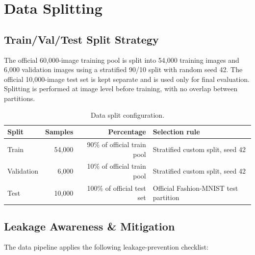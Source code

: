 \section{Data Splitting}

\subsection{Train/Val/Test Split Strategy}

The official 60,000-image training pool is split into 54,000 training images and 6,000 validation images using a stratified 90/10 split with random seed 42. The official 10,000-image test set is kept separate and is used only for final evaluation. Splitting is performed at image level before training, with no overlap between partitions.

\begin{table}[H]
    \centering
    \caption{Data split configuration.}
    \label{tab:data-split}
    \begin{tabular}{@{}lrrl@{}}
        \toprule
        Split & Samples & Percentage & Selection rule \\
        \midrule
        Train & 54,000 & 90\% of official train pool & Stratified custom split, seed 42 \\
        Validation & 6,000 & 10\% of official train pool & Stratified custom split, seed 42 \\
        Test & 10,000 & 100\% of official test set & Official Fashion-MNIST test partition \\
        \bottomrule
    \end{tabular}
\end{table}

    \subsection{Leakage Awareness \& Mitigation}

    The data pipeline applies the following leakage-prevention checklist:

